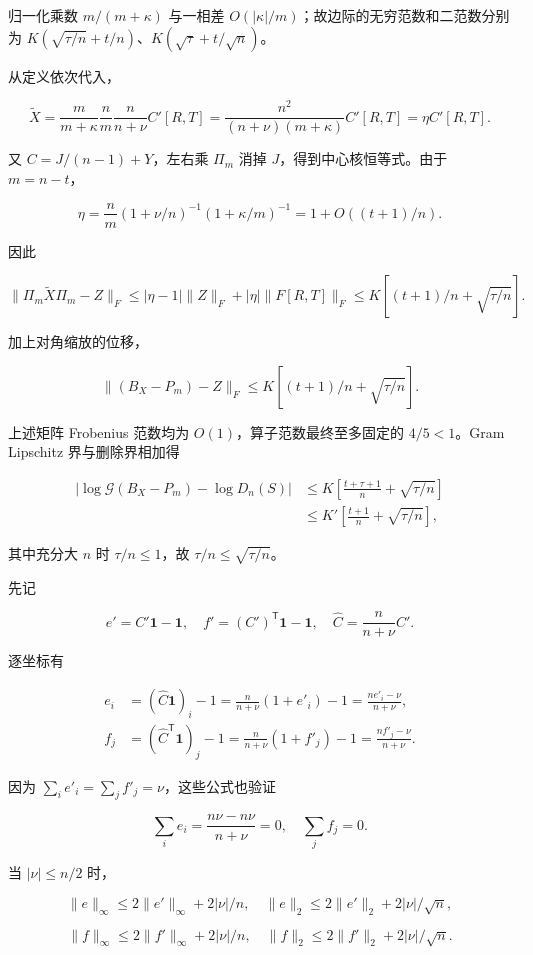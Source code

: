 \documentclass[11pt,a4paper]{article}
\begin{document}
归一化乘数 \(m/(m+\kappa)\) 与一相差 \(O(|\kappa|/m)\)；故边际的无穷范数和二范数分别为 \(K(\sqrt{\tau/n}+t/n)\)、\(K(\sqrt\tau+t/\sqrt n)\)。

从定义依次代入，

\[\widetilde X=\frac m{m+\kappa}\frac nm\frac n{n+\nu}C'[R,T]
=\frac{n^2}{(n+\nu)(m+\kappa)}C'[R,T]=\eta C'[R,T].\]

又 \(C=J/(n-1)+Y\)，左右乘 \(\Pi_m\) 消掉 \(J\)，得到中心核恒等式。由于 \(m=n-t\)，

\[\eta=\frac nm(1+\nu/n)^{-1}(1+\kappa/m)^{-1}
=1+O((t+1)/n).\]

因此

\[\|\Pi_m\widetilde X\Pi_m-Z\|_F
\le|\eta-1|\|Z\|_F+|\eta|\|F[R,T]\|_F
\le K[(t+1)/n+\sqrt{\tau/n}].\]

加上对角缩放的位移，

\[\|(B_X-P_m)-Z\|_F
\le K[(t+1)/n+\sqrt{\tau/n}].\]

上述矩阵 Frobenius 范数均为 \(O(1)\)，算子范数最终至多固定的 \(4/5<1\)。Gram Lipschitz 界与删除界相加得

\[\begin{aligned}
|\log\mathcal G(B_X-P_m)-\log D_n(S)|
&\le K\left[\frac{t+\tau+1}n+\sqrt{\tau/n}\right]\\
&\le K'\left[\frac{t+1}n+\sqrt{\tau/n}\right],
\end{aligned}\]

其中充分大 \(n\) 时 \(\tau/n\le1\)，故 \(\tau/n\le\sqrt{\tau/n}\)。

先记

\[e'=C'\mathbf1-\mathbf1,\quad
f'=(C')^{\mathsf T}\mathbf1-\mathbf1,\quad
\widehat C=\frac n{n+\nu}C'.\]

逐坐标有

\[\begin{aligned}
e_i&=(\widehat C\mathbf1)_i-1
=\frac n{n+\nu}(1+e'_i)-1
=\frac{ne'_i-\nu}{n+\nu},\\
f_j&=(\widehat C^{\mathsf T}\mathbf1)_j-1
=\frac n{n+\nu}(1+f'_j)-1
=\frac{nf'_j-\nu}{n+\nu}.
\end{aligned}\]

因为 \(\sum_ie'_i=\sum_jf'_j=\nu\)，这些公式也验证

\[\sum_ie_i=\frac{n\nu-n\nu}{n+\nu}=0,\quad
\sum_jf_j=0.\]

当 \(|\nu|\le n/2\) 时，

\[\|e\|_\infty\le2\|e'\|_\infty+2|\nu|/n,\quad
\|e\|_2\le2\|e'\|_2+2|\nu|/\sqrt n,\]

\[\|f\|_\infty\le2\|f'\|_\infty+2|\nu|/n,\quad
\|f\|_2\le2\|f'\|_2+2|\nu|/\sqrt n.\]
\end{document}
